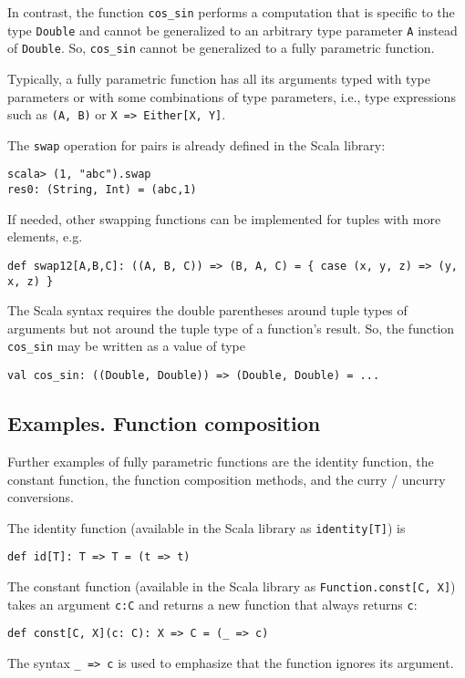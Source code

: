 In contrast, the function \lstinline!cos_sin! performs a computation
that is specific to the type \lstinline!Double! and cannot be generalized
to an arbitrary type parameter \lstinline!A! instead of \lstinline!Double!.
So, \lstinline!cos_sin! cannot be generalized to a fully parametric
function.

Typically, a fully parametric function has all its arguments typed
with type parameters or with some combinations of type parameters,
i.e., type expressions such as \lstinline!(A, B)! or \lstinline!X => Either[X, Y]!.

The \lstinline!swap! operation for pairs is already defined in the
Scala library:
\begin{lstlisting}
scala> (1, "abc").swap
res0: (String, Int) = (abc,1)
\end{lstlisting}
If needed, other swapping functions can be implemented for tuples
with more elements, e.g.
\begin{lstlisting}
def swap12[A,B,C]: ((A, B, C)) => (B, A, C) = { case (x, y, z) => (y, x, z) }
\end{lstlisting}
The Scala syntax requires the double parentheses around tuple types
of arguments but not around the tuple type of a function\textsf{'}s result.
So, the function \lstinline!cos_sin! may be written as a value of
type
\begin{lstlisting}
val cos_sin: ((Double, Double)) => (Double, Double) = ...
\end{lstlisting}


\subsection{Examples. Function composition\label{subsec:Examples-of-fully-parametric}}

Further examples of fully parametric functions are the identity function,
the constant function, the function composition methods, and the curry
/ uncurry conversions. 

The identity function (available in the
Scala library as \lstinline!identity[T]!) is
\begin{lstlisting}
def id[T]: T => T = (t => t)
\end{lstlisting}
The constant function (available in the
Scala library as \lstinline!Function.const[C, X]!) takes an argument
\lstinline!c:C! and returns a new function that always returns \lstinline!c!:
\begin{lstlisting}
def const[C, X](c: C): X => C = (_ => c)
\end{lstlisting}
The syntax \lstinline!_ => c! is used to emphasize that the function
ignores its argument.

